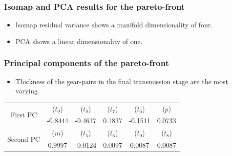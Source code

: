 \documentclass[svgnames, table, smaller]{beamer}
\begin{document}
\begin{frame}
  \frametitle{Isomap and PCA results for the pareto-front}

  \begin{itemize}
  \item Isomap residual variance shows a manifold dimensionality of four.
  \item PCA shows a linear dimensionality of one.
  \end{itemize}

  \begin{figure}[ht]
    \begin{center}
      \label{gt11vars}
    \end{center}
  \end{figure}


\end{frame}


\begin{frame}
  \frametitle{Principal components of the pareto-front}

  \begin{itemize}
  \item Thickness of the gear-pairs in the final transmission stage are the
    most varying.
  \end{itemize}

  {\small
    \begin{table}[!ht]
      \centering
      \begin{tabular}{|c|c|c|c|c|c|}
        \hline
        \multirow{2}{*}{First PC}   & ($t_9$) &  ($t_8$) &  ($t_7$)  & ($t_6$) & ($p$)\\
        & -0.8444  & -0.4617  & 0.1837 & -0.1511 & 0.0733  \\
        \hline
        \multirow{2}{*}{Second PC}   & ($m$) &  ($t_5$) &  ($t_6$)  & ($t_9$) & ($t_8$)\\
        & 0.9997 & -0.0124 & 0.0097 & 0.0087 &  0.0087 \\
        \hline
      \end{tabular}
      \label{first2GT11PCs}
    \end{table}
  }

\end{frame}
\end{document}
